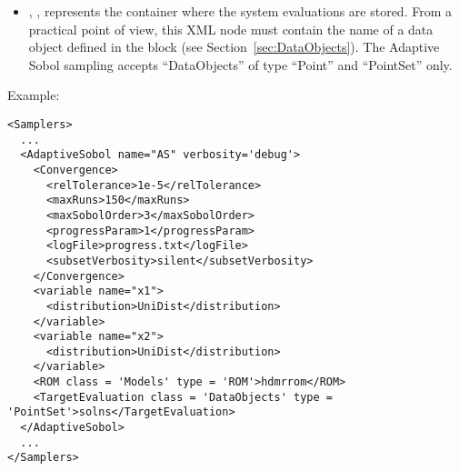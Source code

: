        \begin{itemize}
      \item {}, ,
        represents the container where the system evaluations are stored.
        From a practical point of view, this XML node must contain the name of
        a data object defined in the  block (see
        Section~\ref{sec:DataObjects}).
        The Adaptive Sobol sampling accepts ``DataObjects'' of type ``Point'' and
        ``PointSet'' only.
\end{itemize}

Example:
\begin{lstlisting}[style=XML,morekeywords={class,limit,subGridTol,weight,persistence}]
<Samplers>
  ...
  <AdaptiveSobol name="AS" verbosity='debug'>
    <Convergence>
      <relTolerance>1e-5</relTolerance>
      <maxRuns>150</maxRuns>
      <maxSobolOrder>3</maxSobolOrder>
      <progressParam>1</progressParam>
      <logFile>progress.txt</logFile>
      <subsetVerbosity>silent</subsetVerbosity>
    </Convergence>
    <variable name="x1">
      <distribution>UniDist</distribution>
    </variable>
    <variable name="x2">
      <distribution>UniDist</distribution>
    </variable>
    <ROM class = 'Models' type = 'ROM'>hdmrrom</ROM>
    <TargetEvaluation class = 'DataObjects' type = 'PointSet'>solns</TargetEvaluation>
  </AdaptiveSobol>
  ...
</Samplers>
\end{lstlisting}
